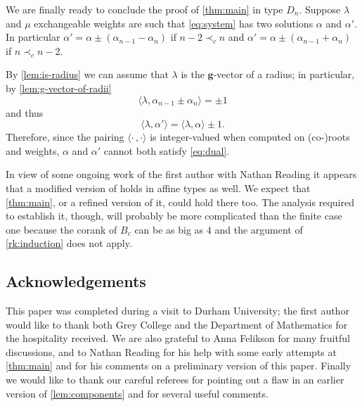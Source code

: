 \documentclass[pdftex]{sigma}
\numberwithin{equation}{section}
\numberwithin{theorem}{section}
\numberwithin{proposition}{section}
\numberwithin{lemma}{section}
\numberwithin{corollary}{section}
\numberwithin{definition}{section}
\numberwithin{example}{section}
\numberwithin{remark}{section}
\numberwithin{note}{section}
\newcommand{\bg}{\mathbf{g}}
\begin{document}
  We are finally ready to conclude the proof of \cref{thm:main} in type $D_n$.
  Suppose $\lambda$ and $\mu$ exchangeable weights are such that \cref{eq:system} has two solutions $\alpha$ and $\alpha'$.
  In particular $\alpha' = \alpha \pm (\alpha_{n-1}-\alpha_n)$ if $n-2 \prec_c n$ and $\alpha' = \alpha \pm (\alpha_{n-1}+\alpha_n)$ if $n \prec_c n-2$.

  By \cref{lem:is-radius} we can assume that $\lambda$ is the $\bg$-vector of a radius; in particular, by \cref{lem:g-vector-of-radii}
  \[
    \langle \lambda, \alpha_{n-1}\pm \alpha_n \rangle = \pm 1
  \]
  and thus
  \[
    \langle \lambda, \alpha' \rangle =
    \langle \lambda, \alpha \rangle \pm 1.
  \]
  Therefore, since the pairing $\langle\cdot\,,\cdot\rangle$ is integer-valued when computed on (co-)roots and weights, $\alpha$ and $\alpha'$ cannot both satisfy \cref{eq:dual}.

  \begin{remark}
    In view of some ongoing work of the first author with Nathan Reading it appears that a modified version of \cite[Propositions 5.1 and 5.2]{Ste13} holds in affine types as well.
    We expect that \cref{thm:main}, or a refined version of it, could hold there too.
    The analysis required to establish it, though, will probably be more complicated than the finite case one because the corank of $B_c$ can be as big as $4$ and the argument of \cref{rk:induction} does not apply.
  \end{remark}

\subsection*{Acknowledgements}
  This paper was completed during a visit to Durham University; the first author would like to thank both Grey College and the Department of Mathematics for the hospitality received.
  We are also grateful to Anna Felikson for many fruitful discussions, and to Nathan Reading for his help with some early attempts at \cref{thm:main} and for his comments on a preliminary version of this paper.
  Finally we would like to thank our careful referees for pointing out a flaw in an earlier version of \cref{lem:components} and for several useful comments.



\end{document}

